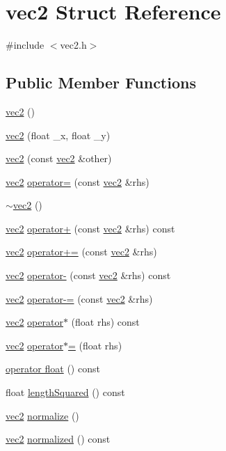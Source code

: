\hypertarget{structvec2}{}\section{vec2 Struct Reference}
\label{structvec2}


{\ttfamily \#include $<$vec2.\+h$>$}

\subsection*{Public Member Functions}
\begin{DoxyCompactItemize}
\item 
\hyperlink{structvec2_ae12a1a221eca3561809600a11b58eaa3}{vec2} ()
\item 
\hyperlink{structvec2_a6a3b46530cd2ed011bb5cdbbec62be26}{vec2} (float \+\_\+x, float \+\_\+y)
\item 
\hyperlink{structvec2_a0fcc1b7272d1ebd806cca02d29563053}{vec2} (const \hyperlink{structvec2}{vec2} \&other)
\item 
\hyperlink{structvec2}{vec2} \hyperlink{structvec2_a3cb4130bbf48a0234bbd70a6e5603bb2}{operator=} (const \hyperlink{structvec2}{vec2} \&rhs)
\item 
\hyperlink{structvec2_a1ae1b7c30215e766b3e56bf79112ffc1}{$\sim$vec2} ()
\item 
\hyperlink{structvec2}{vec2} \hyperlink{structvec2_a8ddc4154c0d2688aecf156a3d3ebc7c7}{operator+} (const \hyperlink{structvec2}{vec2} \&rhs) const
\item 
\hyperlink{structvec2}{vec2} \hyperlink{structvec2_ad0cc0e5f6a564ec00824bd35fe112c46}{operator+=} (const \hyperlink{structvec2}{vec2} \&rhs)
\item 
\hyperlink{structvec2}{vec2} \hyperlink{structvec2_a8951488e5d92bbd54212bacc0753c079}{operator-\/} (const \hyperlink{structvec2}{vec2} \&rhs) const
\item 
\hyperlink{structvec2}{vec2} \hyperlink{structvec2_af53cb37ea6fd794dbdaf1a1de9a5cf5c}{operator-\/=} (const \hyperlink{structvec2}{vec2} \&rhs)
\item 
\hyperlink{structvec2}{vec2} \hyperlink{structvec2_a68f9765fd1eac99396be0958e15a908c}{operator$\ast$} (float rhs) const
\item 
\hyperlink{structvec2}{vec2} \hyperlink{structvec2_aaeef9a4b188905735d1c7996dafb77cb}{operator$\ast$=} (float rhs)
\item 
\hyperlink{structvec2_a04106d6297826f99ad1eb28f2b4eb564}{operator float} () const
\item 
float \hyperlink{structvec2_a4bd69636a40be9fe1949d1a3e4b1ff50}{length\+Squared} () const
\item 
\hyperlink{structvec2}{vec2} \hyperlink{structvec2_acfc20e9984f37b033b8ace687823700c}{normalize} ()
\item 
\hyperlink{structvec2}{vec2} \hyperlink{structvec2_acb4a4c9ee8c1d81e6e51b1251e0c1f69}{normalized} () const
\end{DoxyCompactItemize}
